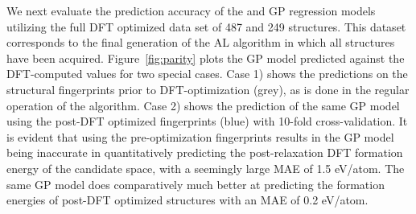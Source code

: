 We next evaluate the prediction accuracy of the \IrOtwo and \IrOthree GP regression models utilizing the full DFT optimized data set of 487 \IrOtwo and 249 \IrOthree structures.
%
This dataset corresponds to the final generation of the AL algorithm in which all structures have been acquired.
%
Figure~\ref{fig:parity} plots the GP model predicted \DHf against the DFT-computed values for two special cases.
%
Case 1) shows the predictions on the structural fingerprints prior to DFT-optimization (grey), as is done in the regular operation of the algorithm.
%
Case 2) shows the prediction of the same GP model using the post-DFT optimized fingerprints (blue) with \num{10}-fold cross-validation.
%
It is evident that using the pre-optimization fingerprints results in the GP model being inaccurate in quantitatively predicting the post-relaxation DFT formation energy of the candidate space,
with a seemingly large MAE of \mytilde\num{1.5} eV/atom.
%
The same GP model does comparatively much better at predicting the formation energies of post-DFT optimized structures with an MAE of \mytilde\num{0.2} eV/atom.



